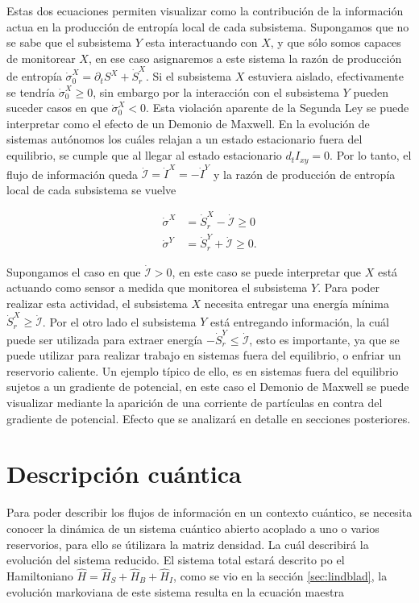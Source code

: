Estas dos ecuaciones permiten visualizar como la contribución de la información actua en la producción de entropía local de cada subsistema. Supongamos que no se sabe que el subsistema $Y$ esta interactuando con $X$, y que sólo somos capaces de monitorear $X$, en ese caso asignaremos a este sistema la razón de producción de entropía $\dot{\sigma}^{X}_{0} = \partial_{t}S^{X} + \dot{S}_{r}^{X}$. Si el subsistema $X$ estuviera aislado, efectivamente se tendría $\dot{\sigma}^{X}_{0} \geq 0$, sin embargo por la interacción  con el subsistema $Y$ pueden suceder casos en que $\dot{\sigma}^{X}_{0}<0$. Esta violación aparente de la Segunda Ley se puede interpretar como el efecto de un Demonio de Maxwell. En la evolución de sistemas autónomos los cuáles relajan a un estado estacionario fuera del equilibrio, se cumple que al llegar al estado estacionario $d_{t}I_{xy} = 0$. Por lo tanto, el flujo de información queda $\dot{\mathcal{I}} = \dot{I}^{X} = - \dot{I}^{Y}$ y la razón de producción de entropía local de cada subsistema se vuelve

\begin{align*}
    \dot{\sigma}^{X} & = \dot{S}_{r}^{X} - \dot{\mathcal{I}} \geq 0 \\
    \dot{\sigma}^{Y} & =  \dot{S}_{r}^{Y} + \dot{\mathcal{I}} \geq 0 . 
\end{align*}

Supongamos el caso en que $\dot{\mathcal{I}}> 0$, en este caso se puede interpretar que $X$ está actuando como sensor a medida que monitorea el subsistema $Y$. Para poder realizar esta actividad, el subsistema $X$ necesita entregar una energía mínima $\dot{S}_{r}^{X} \geq \dot{\mathcal {I}}$. Por el otro lado el subsistema $Y$ está entregando información, la cuál puede ser utilizada para extraer energía $-\dot{S}_{r}^{Y} \leq \dot{\mathcal{I}}$, esto es importante, ya que se puede utilizar para realizar trabajo en sistemas fuera del equilibrio, o enfriar un reservorio caliente. Un ejemplo típico de ello, es en sistemas fuera del equilibrio sujetos a un gradiente de potencial, en este caso el Demonio de Maxwell se puede visualizar mediante la aparición de una corriente de partículas en contra del gradiente de potencial. Efecto que se analizará en detalle en secciones posteriores.

\section{Descripción cuántica}
Para poder describir los flujos de información en un contexto cuántico, se necesita conocer la dinámica de un sistema cuántico abierto acoplado a uno o varios reservorios, para ello se útilizara la matriz densidad. La cuál describirá la evolución del sistema reducido. El sistema total estará descrito po el Hamiltoniano $\hat{H} = \hat{H}_{S}+\hat{H}_{B}+ \hat{H}_{I}$, como se vio en la sección \ref{sec:lindblad}, la evolución markoviana de este sistema resulta en la ecuación maestra

